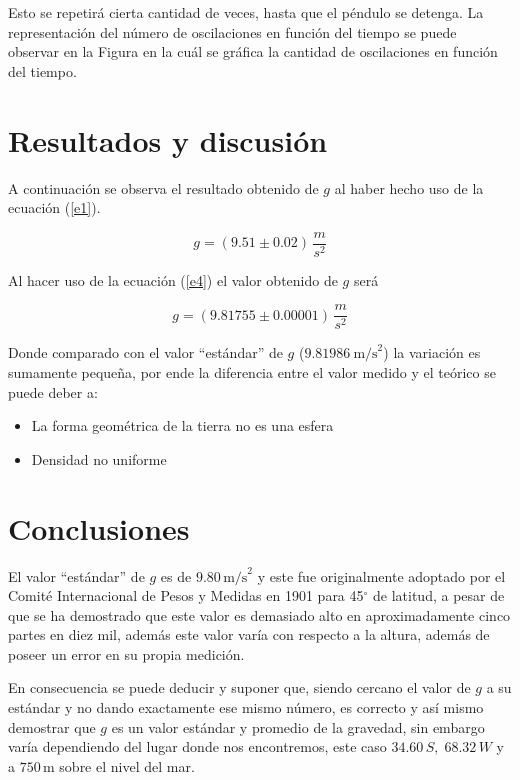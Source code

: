 \documentclass[a4paper,twocolumn]{article}
\begin{document}
Esto se repetirá cierta cantidad de veces, hasta que el péndulo se detenga. La representación del número de oscilaciones en función del tiempo se puede observar en la Figura en la cuál se gráfica la cantidad de oscilaciones en función del tiempo.



\section{Resultados y discusión}

A continuación se observa el resultado obtenido de $g$ al haber hecho uso de la ecuación (\ref{e1}).

\begin{equation*}
    g=(9.51 \pm 0.02)\,\frac{m}{s^{2}}
\end{equation*}

Al hacer uso de la ecuación (\ref{e4}) el valor obtenido de $g$ será


\begin{equation*}
    g=(9.81755 \pm 0.00001)\,\frac{m}{s^{2}}
\end{equation*}

Donde comparado con el valor ``estándar'' de $g$ ($9.81986~\mathrm{m/s}^{2}$)\cite{b4} la variación es sumamente pequeña, por ende la diferencia entre el valor medido y el teórico se puede deber a:

\begin{itemize}
    \item La forma geométrica de la tierra no es una esfera\cite{b11}
    \item Densidad no uniforme~\cite{b11}
\end{itemize}

\section{Conclusiones}

El valor ``estándar'' de $g$ es de $9.80\,\mathrm{m/s}^{2}$ y este fue originalmente adoptado por el Comité Internacional de Pesos y Medidas en 1901\cite{b9} para 45$^\circ$ de latitud, a pesar de que se ha demostrado que este valor es demasiado alto en aproximadamente cinco partes en diez mil\cite{b9}, además este valor varía con respecto a la altura, además de poseer un error en su propia medición.

En consecuencia se puede deducir y suponer que, siendo cercano el valor de $g$ a su estándar y no dando exactamente ese mismo número, es correcto y así mismo demostrar que $g$ es un valor estándar y promedio de la gravedad, sin embargo varía dependiendo del lugar donde nos encontremos, este caso $34.60\,S,\;68.32\,W$ y a $750\,\mathrm{m}$ sobre el nivel del mar.
\end{document}

